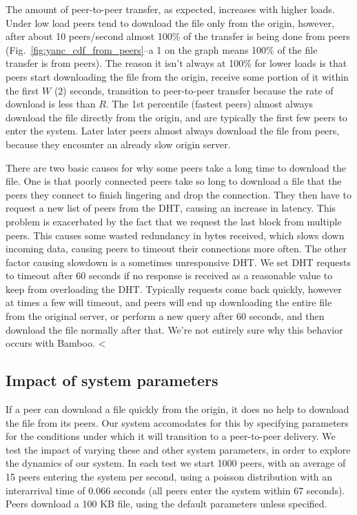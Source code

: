 The amount of peer-to-peer transfer, as expected, increases with higher loads. Under low load peers tend to download 
the file only from the origin, however, after about 10 peers/second almost 100\% of the transfer is being 
done from peers (Fig.~\ref{fig:yanc_cdf_from_peers}--a 1 on the graph means 100\% of the file 
transfer is from peers). The reason it isn't always at 100\% for lower loads is that peers start 
downloading the file from the origin, receive some portion of it within the first $W$ (2) seconds, 
transition to peer-to-peer transfer because the rate of download is less than $R$.
The 1st percentile (fastest peers) almost always download the file directly from the origin, and are typically 
the first few peers to enter the system.  Later later peers almost always download the 
file from peers, because they encounter an already slow origin server. 

There are two basic causes for why some peers take a long time to download the file.  One is that poorly connected peers take so long to download a file 
that the peers they connect to finish lingering and drop the connection.  They then have to request a new 
list of peers from the DHT, causing an increase in latency.  This problem is exacerbated by the fact that we request 
the last block from multiple peers.  This causes 
some wasted redundancy in bytes received, which slows down incoming data, causing peers to timeout their
connections more often. The other factor causing slowdown is a sometimes unresponsive DHT. We 
set DHT requests to timeout after 60 seconds if no response is received as a reasonable value to keep from 
overloading the DHT. Typically requests come back quickly, however at times a few will timeout, 
and peers will end up downloading the entire file from the original server, or perform a new 
query after 60 seconds, and then download the file normally after that.  We're not entirely sure why this behavior occurs with Bamboo.
<%

\subsection{Impact of system parameters}

If a peer can download a file quickly from the origin, it does no help to download the file from its
peers. Our system accomodates for this by specifying parameters for the conditions under which it will 
transition to a peer-to-peer delivery. We test the impact of varying these and other system parameters, in order 
to explore the dynamics of our system. In each test we start 1000 peers, with an average of 15 peers entering 
the system per second, using a poisson distribution with an interarrival time of 0.066 seconds (all peers enter the system within 67 seconds). 
Peers download a 100 KB file, using the default parameters unless specified.

